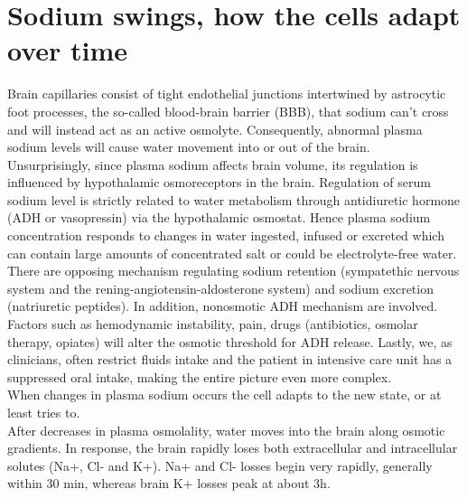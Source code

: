 \section{Sodium swings, how the cells adapt over time}
Brain capillaries consist of tight endothelial junctions intertwined by astrocytic foot processes, the so-called blood-brain barrier (BBB), that sodium can't cross and will instead act as an active osmolyte. Consequently, abnormal plasma sodium levels will cause water movement into or out of the brain.\\

Unsurprisingly, since plasma sodium affects brain volume, its regulation is influenced by hypothalamic osmoreceptors in the brain. 
\newline Regulation of serum sodium level is strictly related to water metabolism through antidiuretic hormone (ADH or vasopressin) via the hypothalamic osmostat. Hence plasma sodium concentration responds to changes in water ingested, infused or excreted which can contain large amounts of concentrated salt or could be electrolyte-free water. There are opposing mechanism regulating sodium retention  (sympatethic nervous system and the rening-angiotensin-aldosterone system) and sodium excretion (natriuretic peptides). 
\newline In addition, nonosmotic ADH mechanism are involved. Factors such as hemodynamic instability, pain, drugs (antibiotics, osmolar therapy, opiates) will alter the osmotic threshold for ADH release.
Lastly, we, as clinicians, often restrict fluids intake and the patient in intensive care unit has a suppressed oral intake, making the entire picture even more complex.\\

When changes in plasma sodium occurs the cell adapts to the new state, or at least tries to.\\

After decreases in plasma osmolality, water moves into the brain along osmotic gradients. In response, the brain rapidly loses both extracellular and intracellular solutes (Na+, Cl- and K+). Na+ and Cl- losses begin very rapidly, generally within 30 min, whereas brain K+ losses peak at about 3h. \cite{verbalisBrainVolumeRegulation2010a}\\

